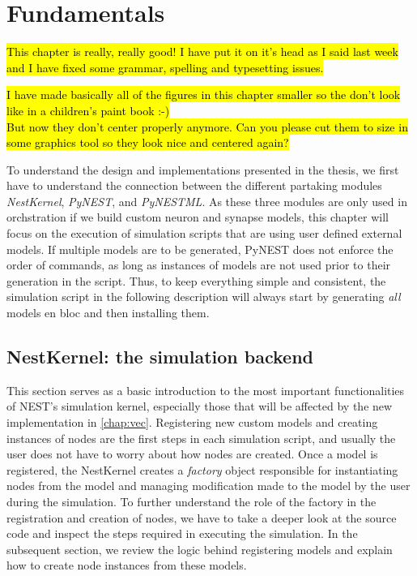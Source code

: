 \chapter{Fundamentals}
\label{chap:funds}

\hl{This chapter is really, really good! I have put it on it's head as I said last week and I have fixed some grammar, spelling and typesetting issues.}

\hl{I have made basically all of the figures in this chapter smaller so the don't look like in a children's paint book :-) \\ But now they don't center properly anymore. Can you please cut them to size in some graphics tool so they look nice and centered again?}

To understand the design and implementations presented in the thesis, we first have to understand the connection between the different partaking modules \emph{NestKernel}, \emph{PyNEST}, and \emph{PyNESTML}. As these three modules are only used in orchstration if we build custom neuron and synapse models, this chapter will focus on the execution of simulation scripts that are using user defined external models. If multiple models are to be generated, PyNEST does not enforce the order of commands, as long as instances of models are not used prior to their generation in the script. Thus, to keep everything simple and consistent, the simulation script in the following description will always start by generating \emph{all} models en bloc and then installing them.

\section{NestKernel: the simulation backend}

This section serves as a basic introduction to the most important functionalities of NEST's simulation kernel, especially those that will be affected by the new implementation in \autoref{chap:vec}. Registering new custom models and creating instances of nodes are the first steps in each simulation script, and usually the user does not have to worry about how nodes are created. Once a model is registered, the NestKernel creates a \emph{factory} object responsible for instantiating nodes from the model and managing modification made to the model by the user during the simulation. To further understand the role of the factory in the registration and creation of nodes, we have to take a deeper look at the source code and inspect the steps required in executing the simulation. In the subsequent section, we review the logic behind registering models and explain how to create node instances from these models.

